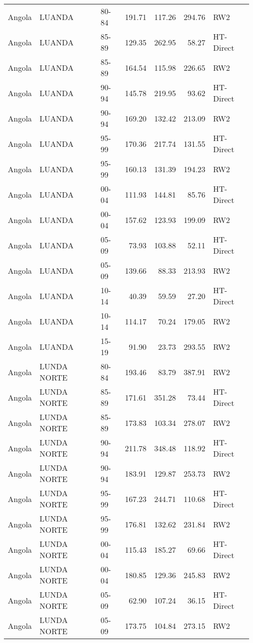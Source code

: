 \begin{longtable}{lllrrrl}
  Angola & LUANDA & 80-84 & 191.71 & 117.26 & 294.76 & RW2 \\ 
  Angola & LUANDA & 85-89 & 129.35 & 262.95 & 58.27 & HT-Direct \\ 
  Angola & LUANDA & 85-89 & 164.54 & 115.98 & 226.65 & RW2 \\ 
  Angola & LUANDA & 90-94 & 145.78 & 219.95 & 93.62 & HT-Direct \\ 
  Angola & LUANDA & 90-94 & 169.20 & 132.42 & 213.09 & RW2 \\ 
  Angola & LUANDA & 95-99 & 170.36 & 217.74 & 131.55 & HT-Direct \\ 
  Angola & LUANDA & 95-99 & 160.13 & 131.39 & 194.23 & RW2 \\ 
  Angola & LUANDA & 00-04 & 111.93 & 144.81 & 85.76 & HT-Direct \\ 
  Angola & LUANDA & 00-04 & 157.62 & 123.93 & 199.09 & RW2 \\ 
  Angola & LUANDA & 05-09 & 73.93 & 103.88 & 52.11 & HT-Direct \\ 
  Angola & LUANDA & 05-09 & 139.66 & 88.33 & 213.93 & RW2 \\ 
  Angola & LUANDA & 10-14 & 40.39 & 59.59 & 27.20 & HT-Direct \\ 
  Angola & LUANDA & 10-14 & 114.17 & 70.24 & 179.05 & RW2 \\ 
  Angola & LUANDA & 15-19 & 91.90 & 23.73 & 293.55 & RW2 \\ 
  Angola & LUNDA NORTE & 80-84 & 193.46 & 83.79 & 387.91 & RW2 \\ 
  Angola & LUNDA NORTE & 85-89 & 171.61 & 351.28 & 73.44 & HT-Direct \\ 
  Angola & LUNDA NORTE & 85-89 & 173.83 & 103.34 & 278.07 & RW2 \\ 
  Angola & LUNDA NORTE & 90-94 & 211.78 & 348.48 & 118.92 & HT-Direct \\ 
  Angola & LUNDA NORTE & 90-94 & 183.91 & 129.87 & 253.73 & RW2 \\ 
  Angola & LUNDA NORTE & 95-99 & 167.23 & 244.71 & 110.68 & HT-Direct \\ 
  Angola & LUNDA NORTE & 95-99 & 176.81 & 132.62 & 231.84 & RW2 \\ 
  Angola & LUNDA NORTE & 00-04 & 115.43 & 185.27 & 69.66 & HT-Direct \\ 
  Angola & LUNDA NORTE & 00-04 & 180.85 & 129.36 & 245.83 & RW2 \\ 
  Angola & LUNDA NORTE & 05-09 & 62.90 & 107.24 & 36.15 & HT-Direct \\ 
  Angola & LUNDA NORTE & 05-09 & 173.75 & 104.84 & 273.15 & RW2 \\ 

\end{longtable}
